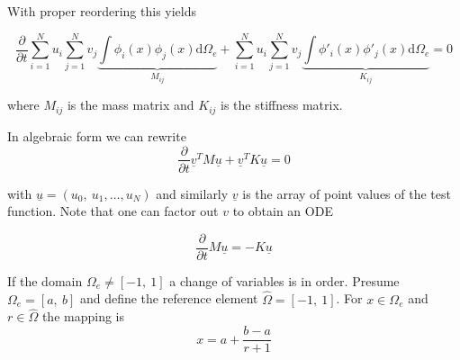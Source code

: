 \documentclass[10pt]{article}
\renewcommand{\d}{\mathrm{d}}
\begin{document}
With proper reordering this yields

\begin{equation}
\frac{\partial}{\partial t}\sum_{i=1}^N u_{i}\sum_{j=1}^N  v_{j}\underbrace{\int \phi_i(x)\phi_j(x) \d \Omega_e}_{M_{ij}} + \sum_{i=1}^N u_{i}\sum_{j=1}^N v_{j}\underbrace{\int\phi'_i(x) \phi'_j(x) \d \Omega_e}_{K_{ij}}  =0
\end{equation}

where $M_{ij}$ is the mass matrix and $K_{ij}$ is the stiffness matrix.

In algebraic form we can rewrite
\begin{equation}
\frac{\partial}{\partial t}\underline{v}^TM\underline{u} + \underline{v}^TK\underline{u}=0
\end{equation}

with $\underline{u}=(u_0,\ u_1, \ldots, u_N)$ and similarly $\underline v$ is the array of point values of the test function. 
Note that one can factor out $v$ to obtain an ODE

\begin{equation}
\frac{\partial}{\partial t} M \underline{u}=- K \underline{u} \label{eq:discrete}
\end{equation}

If the domain $\Omega_e \neq [-1, \ 1]$ a change of variables is in order.
Presume  $\Omega_e = [a, \ b]$ and define the reference element $\hat{\Omega} = [-1, \ 1]$.
For $x\in \Omega_e$ and $r \in \hat{\Omega}$ the mapping is
$$x= a+ \frac{b-a}{r+1}$$
\end{document}
